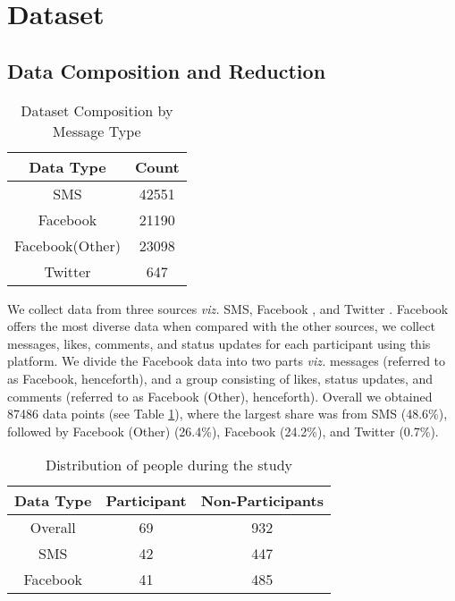 \section{Dataset}
\label{sec:dataset}
\subsection{Data Composition and Reduction}
\begin{table}[h]
\centering
\caption{Dataset Composition by Message Type}
\begin{tabular}{| c | c |}
\hline
\textbf{Data Type} & \textbf{Count} \\
\hline
SMS & 42551\\
\hline
Facebook & 21190\\
\hline
Facebook(Other) & 23098\\
\hline
Twitter & 647\\
\hline
\end{tabular}
\label{table:datasetCompositionMsgT}
\end{table}

We collect data from three sources \emph{viz.} SMS, Facebook \cite{facebook2016}, and Twitter \cite{twitter2016}. 
Facebook offers the most diverse data when compared with the other sources, we collect messages, likes, comments, and status updates for each participant using this platform. 
We divide the Facebook data into two parts \emph{viz.} messages (referred to as Facebook, henceforth), and a group consisting of likes, status updates, and comments (referred to as Facebook (Other), henceforth). 
Overall we obtained 87486 data points (see Table \ref{table:datasetCompositionMsgT}), where the largest share was from SMS (48.6\%), followed by Facebook (Other) (26.4\%), Facebook (24.2\%), and Twitter (0.7\%). 

\begin{table}[h]
\centering
\caption{Distribution of people during the study}
\begin{tabular}{| c | c | c |}
\hline
\textbf{Data Type} & \textbf{Participant} & \textbf{Non-Participants}\\
\hline
Overall & 69 & 932\\
\hline
SMS & 42 & 447\\
\hline
Facebook & 41 & 485\\
\hline
\end{tabular}
\label{table:datasetPvNP}
\end{table}

